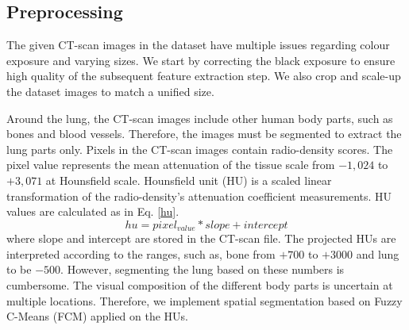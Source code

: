 \documentclass[conference]{IEEEtran}
\begin{document}
\subsection{Preprocessing}
The given CT-scan images in the dataset have multiple issues regarding colour exposure and varying sizes. We start by correcting the black exposure to ensure high quality of the subsequent feature extraction step. We also crop and scale-up the dataset images to match a unified size. 

Around the lung, the CT-scan images include other human body parts, such as bones and blood vessels. Therefore, the images must be segmented to extract the lung parts only. Pixels in the CT-scan images contain radio-density scores. The pixel value represents the mean attenuation of the tissue scale from $-1,024$ to $+3,071$ at Hounsfield scale. Hounsfield unit (HU) is a scaled linear transformation of the radio-density's attenuation coefficient measurements. HU values are calculated as in Eq. \ref{hu}.
\begin{equation}\label{hu}
    hu = pixel_{value} * slope + intercept
\end{equation}
where slope and intercept are stored in the CT-scan file. The projected HUs are interpreted according to the ranges, such as, bone from $+700$ to $+3000$ and lung to be $-500$. However, segmenting the lung based on these numbers is cumbersome. The visual composition of the different body parts is uncertain at multiple locations. Therefore, we implement spatial segmentation based on Fuzzy C-Means (FCM) applied on the HUs.
\end{document}
